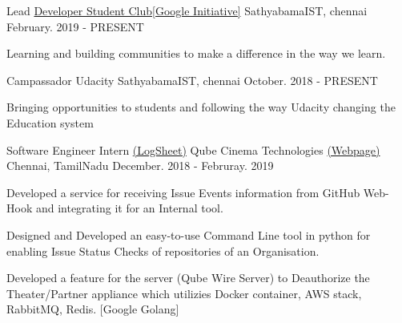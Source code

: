 

\begin{cventries}

  \cventry
    {Lead} %
    {\href{https://sites.google.com/view/sathyabamacodingclub}{Developer Student Club[Google Initiative]}} %
    {SathyabamaIST, chennai} %
    {February. 2019 - PRESENT} %
    {
      \begin{cvitems} %
        \item {Learning and building communities to make a difference in the way we learn.}
      \end{cvitems}
    }



  \cventry
    {Campassador} %
    {Udacity} %
    {SathyabamaIST, chennai} %
    {October. 2018 - PRESENT} %
    {
      \begin{cvitems} %
        \item {Bringing opportunities to students and following the way Udacity changing the Education system}
      \end{cvitems}
    }
    
    
    
  \cventry
    {Software Engineer Intern \href{https://docs.google.com/spreadsheets/d/1dDO6C-KJg47RTLgM4caVn2qnPnrNxWdrVtkyauuFjb4/edit?usp=sharing}{(LogSheet)}} %
    {Qube Cinema Technologies \href{https://www.qubecinema.com/}{(Webpage)} } %
    {Chennai, TamilNadu} %
    {December. 2018 - Februray. 2019} %
    {
      \begin{cvitems} %
        \item {Developed a service for receiving Issue Events information from GitHub Web-Hook and integrating it for an Internal tool.}
        \item {Designed and Developed an easy-to-use Command Line tool in python for enabling Issue Status Checks of repositories of an Organisation.}
        \item {Developed a feature for the server (Qube Wire Server) to Deauthorize the Theater/Partner appliance which utilizies Docker container, AWS stack, RabbitMQ, Redis. [Google Golang]}
      \end{cvitems}
    }


\end{cventries}
